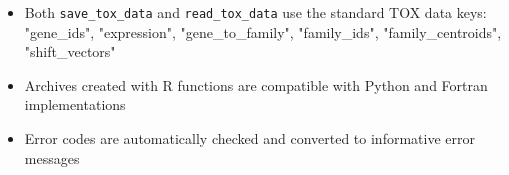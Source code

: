 \begin{enumerate}
\begin{itemize}
    \item Both \texttt{save\_tox\_data} and \texttt{read\_tox\_data} use the
          standard TOX data keys: "gene\_ids", "expression", "gene\_to\_family",
          "family\_ids", "family\_centroids", "shift\_vectors"
          
    \item Archives created with R functions are compatible with Python and Fortran
          implementations
          
    \item Error codes are automatically checked and converted to informative
          error messages
\end{itemize}
\end{enumerate}